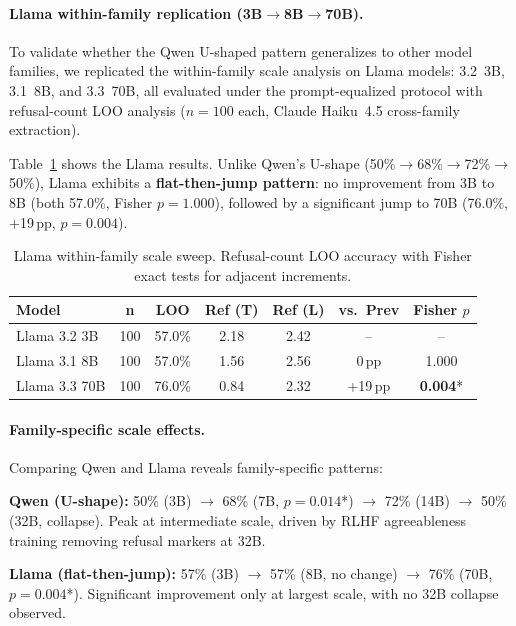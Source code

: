 
\paragraph{Llama within-family replication (3B$\to$8B$\to$70B).}
To validate whether the Qwen U-shaped pattern generalizes to other model families, we replicated the within-family scale analysis on Llama models: 3.2~3B, 3.1~8B, and 3.3~70B, all evaluated under the prompt-equalized protocol with refusal-count LOO analysis ($n=100$ each, Claude Haiku~4.5 cross-family extraction).

Table~\ref{tab:llama_scale_sweep} shows the Llama results. Unlike Qwen's U-shape (50\%$\to$68\%$\to$72\%$\to$50\%), Llama exhibits a \textbf{flat-then-jump pattern}: no improvement from 3B to 8B (both 57.0\%, Fisher $p=1.000$), followed by a significant jump to 70B (76.0\%, $+$19\,pp, $p=0.004$).

\begin{table}[h]
\centering
\caption{Llama within-family scale sweep. Refusal-count LOO accuracy with Fisher exact tests for adjacent increments.}
\label{tab:llama_scale_sweep}
\begin{tabular}{lcccccc}
\toprule
\textbf{Model} & \textbf{n} & \textbf{LOO} & \textbf{Ref (T)} & \textbf{Ref (L)} & \textbf{vs.\ Prev} & \textbf{Fisher $p$} \\
\midrule
Llama 3.2 3B  & 100 & 57.0\% & 2.18 & 2.42 & -- & -- \\
Llama 3.1 8B  & 100 & 57.0\% & 1.56 & 2.56 & 0\,pp & 1.000 \\
Llama 3.3 70B & 100 & 76.0\% & 0.84 & 2.32 & +19\,pp & \textbf{0.004}* \\
\bottomrule
\end{tabular}
\end{table}

\paragraph{Family-specific scale effects.}
Comparing Qwen and Llama reveals family-specific patterns:

\textbf{Qwen (U-shape):} 50\% (3B) $\to$ 68\% (7B, $p=0.014$*) $\to$ 72\% (14B) $\to$ 50\% (32B, collapse). Peak at intermediate scale, driven by RLHF agreeableness training removing refusal markers at 32B.

\textbf{Llama (flat-then-jump):} 57\% (3B) $\to$ 57\% (8B, no change) $\to$ 76\% (70B, $p=0.004$*). Significant improvement only at largest scale, with no 32B collapse observed.

